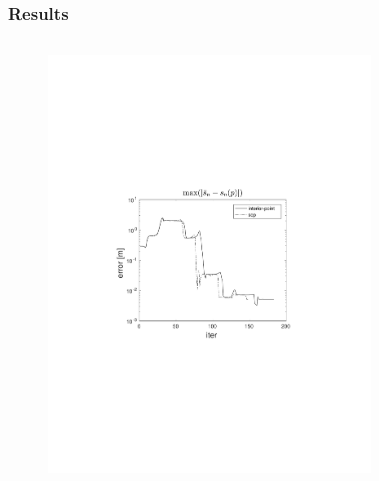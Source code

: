\begin{frame}
    \frametitle{Results}
    \begin{columns}[t]
            \begin{figure}
                \centering
                \includegraphics[trim=4cm 9cm 4cm 8.5cm, clip=true, width=\linewidth]{img/convPlotS_1}
            \end{figure}
            \begin{figure}
                \centering

\end{figure}
\end{columns}
\end{frame}
